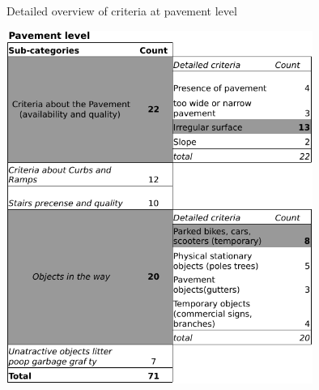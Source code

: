 \begin{table}
\caption{Detailed overview of criteria at pavement level \label{literaturepavement}}
\includegraphics[width=0.75\textwidth]{img/R_Final_overview_literature_pavement.pdf}
\end{table}








